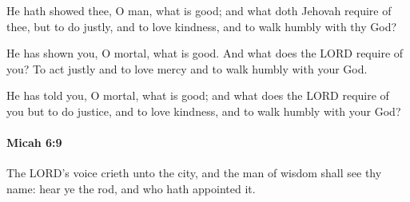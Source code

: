 			\begin{versebox}
					\item[BHS] 
					\item[LXX] 
					\item[ASV] He hath showed thee, O man, what is good; and what doth Jehovah require of thee, but to do justly, and to love kindness, and to walk humbly with thy God?
					\item[NIV] He has shown you, O mortal, what is good. And what does the LORD require of you? To act justly and to love mercy and to walk humbly with your God.
					\item[NRSV] He has told you, O mortal, what is good; and what does the LORD require of you but to do justice, and to love kindness, and to walk humbly with your God?
			\end{versebox}

		\paragraph{Micah 6:9} %
			\label{MICAH-6-9}

			The LORD's voice crieth unto the city, and the man of wisdom shall see thy name: hear ye the rod, and who hath appointed it.

